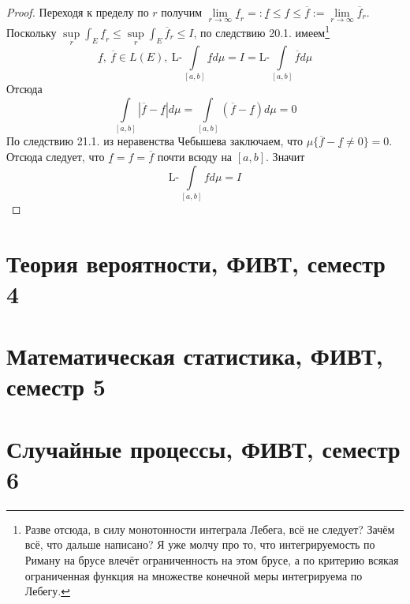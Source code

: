 \documentclass[11pt,a4paper]{report}
\theoremstyle{definition}
\theoremstyle{definition}
\theoremstyle{definition}
\begin{document}
\begin{proof}
		Переходя к пределу по $ r $ получим
		$
			\lim\limits_{r\to\infty} \underline{f}_{r} =: \underline{f} \le f \le \overline{f} :=  \lim\limits_{r\to\infty} \overline{f}_{r}
		$.\\
		Поскольку $ \sup\limits_{r} \int_{E} \underline{f}_{r} \le \sup\limits_{r} \int_{E} \overline{f}_{r} \le I $, по следствию  20.1. имеем\footnote{Разве отсюда, в силу монотонности интеграла Лебега, всё не следует? Зачём всё, что дальше написано? Я уже молчу про то, что интегрируемость по Риману на брусе влечёт ограниченность на этом брусе, а по критерию всякая ограниченная функция на множестве конечной меры интегрируема по Лебегу.}
		\[ \underline{f},\ \overline{f} \in L(E),\ \mbox{L-}\int\limits_{[a, b]} \underline{f} d\mu = I = \mbox{L-}\int\limits_{[a, b]} \overline{f} d\mu \]
		Отсюда 
		\[ 
			\int\limits_{[a, b]} | \overline{f} - \underline{f} | d\mu = \int\limits_{[a, b]} (\overline{f} - \underline{f}) d\mu = 0
		\]
		По следствию 21.1. из неравенства Чебышева заключаем, что $ \mu \{\overline{f} - \underline{f} \neq 0 \} = 0 $.\\
		Отсюда следует, что $ \underline{f} = f = \overline{f} $ почти всюду на $ [a, b] $. Значит\\
		\[
			\mbox{L-}\int\limits_{[a, b]} f d\mu = I
		\]
	\end{proof}
  \part{Теория вероятности, ФИВТ, семестр 4}
  \part{Математическая статистика, ФИВТ, семестр 5}
  \part{Случайные процессы, ФИВТ, семестр 6}
\end{document}
